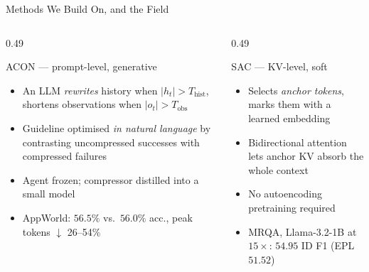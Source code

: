 \documentclass[usenames,dvipsnames,aspectratio=169,10pt]{beamer}
\begin{document}
\begin{frame}{Methods We Build On, and the Field}
\begin{columns}[T]
\begin{column}{0.49\textwidth}
\begin{block}{ACON --- prompt-level, generative}
\scriptsize
\begin{itemize}
  \item An LLM \emph{rewrites} history when $|h_t|>T_{\mathrm{hist}}$, shortens
        observations when $|o_t|>T_{\mathrm{obs}}$
  \item Guideline optimised \emph{in natural language} by contrasting
        uncompressed successes with compressed failures
  \item Agent frozen; compressor distilled into a small model
  \item AppWorld: $56.5\%$ vs.\ $56.0\%$ acc., peak tokens $\downarrow$ 26--54\%
\end{itemize}
\end{block}
\end{column}
\begin{column}{0.49\textwidth}
\begin{block}{SAC --- KV-level, soft}
\scriptsize
\begin{itemize}
  \item Selects \emph{anchor tokens}, marks them with a learned embedding
  \item Bidirectional attention lets anchor KV absorb the whole context
  \item No autoencoding pretraining required
  \item MRQA, Llama-3.2-1B at $15\times$: $54.95$ ID F1 (EPL $51.52$)
\end{itemize}
\end{block}
\end{column}
\end{columns}

\vspace{0.15cm}
\centering
\tiny
\renewcommand{\arraystretch}{1.1}
\setlength{\tabcolsep}{3pt}


\end{frame}
\end{document}
